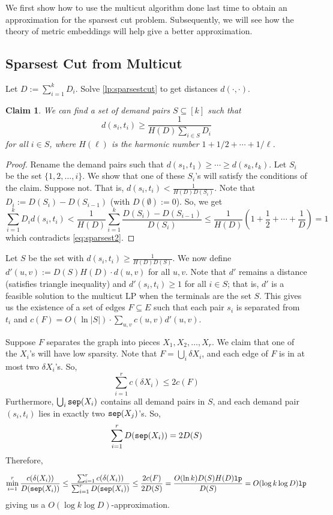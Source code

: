 \documentclass[11pt]{article}
\newtheorem{claim}{Claim}
\def\lp{{\tt lp}}
\begin{document}
We first show how to use the multicut algorithm done last time to obtain an approximation for the sparsest cut problem. 
Subsequently, we will see how the theory of metric embeddings will help give a better approximation.

\subsection*{Sparsest Cut from Multicut}
Let $D := \sum_{i=1}^k D_i$.
Solve \eqref{lp:sparsestcut} to get distances $d(\cdot,\cdot)$. 
\begin{claim}
We can find a set of demand pairs $S\subseteq [k]$ such that  $$d(s_i,t_i) \ge \frac{1}{H(D)\sum_{i\in S} D_i}$$ for all $i\in S$, where $H(\ell)$ is the harmonic number $1 + 1/2 + \cdots + 1/\ell$. 
\end{claim}
\begin{proof}
Rename the demand pairs such that $d(s_1,t_1) \ge \cdots \ge d(s_k,t_k)$. Let $S_i$ be the set $\{1,2,\ldots,i\}$.
We show that one of these $S_i$'s will satisfy the conditions of the claim. Suppose not.
That is, $d(s_i,t_i) < \frac{1}{H(D)D(S_i)}$. Note that $D_i := D(S_i) - D(S_{i-1})$ (with $D(\emptyset) := 0$). 
So, we get
$$\sum_{i=1}^k D_id(s_i,t_i) < \frac{1}{H(D)}\sum_{i=1}^k\frac{D(S_i) - D(S_{i-1})}{D(S_i)} \le \frac{1}{H(D)}\left(1 + \frac{1}{2} + \cdots + \frac{1}{D}\right) = 1$$
which contradicts \eqref{eq:sparsest2}.
\end{proof}
\noindent
Let $S$ be the set with $d(s_i,t_i) \ge \frac{1}{H(D)D(S)}$. We now define $d'(u,v) := D(S)H(D)\cdot d(u,v)$ for all $u,v$.
Note that $d'$ remains a distance (satisfies triangle inequality) and $d'(s_i,t_i) \ge 1$ for all $i\in S$; that is, $d'$ is a feasible
solution to the multicut LP when the terminals are the set $S$. This gives us the existence of a set of edges $F\subseteq E$ such that each pair $s_i$ is separated from $t_i$ and $c(F) = O(\ln |S|)\cdot \sum_{u,v} c(u,v)d'(u,v)$. 

Suppose $F$ separates the graph into pieces $X_1,X_2,\ldots,X_r$. We claim that one of the $X_i$'s will have low sparsity.
Note that $F = \bigcup_i \delta X_i$, and each edge of $F$ is in at most two $\delta X_i$'s. 
So, $$\sum_{i=1}^r c(\delta X_i) \le 2c(F)$$ 
\noindent Furthermore, $\bigcup_i {\tt sep}(X_i)$ contains all demand pairs in $S$, and each demand pair $(s_i,t_i)$ lies in exactly two ${\tt sep}(X_j)$'s. So,
$$\sum_{i=1}^r D({\tt sep}(X_i)) = 2D(S)$$
Therefore,

$$\min_{i=1}^r \frac{c(\delta(X_i))}{D(\sep(X_i))} \le \frac{\sum_{i=1}^r c(\delta(X_i))}{\sum_{i=1}^r D(\sep(X_i))} \le \frac{2c(F)}{2D(S)} = \frac{O(\ln k)D(S)H(D)\lp}{D(S)} = O(\log k\log D)\lp$$
giving us a $O(\log k\log D)$-approximation.
\end{document}
